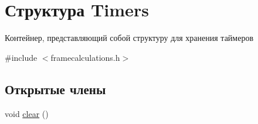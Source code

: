 \hypertarget{struct_timers}{}\section{Структура Timers}
\label{struct_timers}


Контейнер, представляющий собой структуру для хранения таймеров  




{\ttfamily \#include $<$framecalculations.\+h$>$}

\subsection*{Открытые члены}
\begin{DoxyCompactItemize}
\item 
void \mbox{\hyperlink{struct_timers_afc4db9e23485b679e2f069f2860a4326}{clear}} ()
\end{DoxyCompactItemize}
